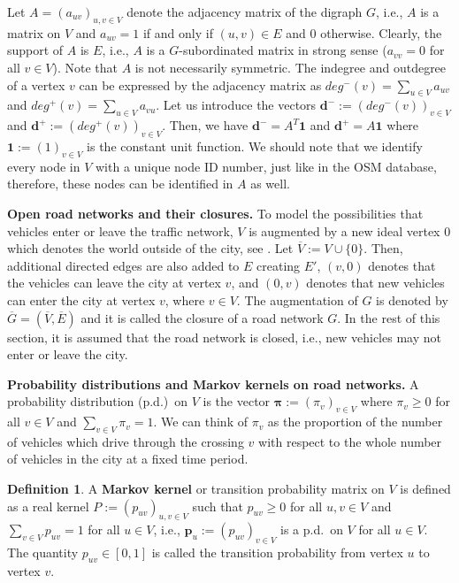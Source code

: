 \documentclass[b5paper,12pt]{report}
\theoremstyle{definition}
\newtheorem{definition}{Definition}
\newcommand{\bd}{\boldsymbol{d}}
\newcommand{\bp}{\boldsymbol{p}}
\newcommand{\bpi}{\boldsymbol{\pi}}
\begin{document}
Let $A = (a_{uv})_{u,v\in V} $ denote the adjacency matrix of the digraph $G$, i.e., $A$ is a matrix on $V$ and $a_{uv} = 1$ if and only if $(u,v) \in E$ and $0$ otherwise. Clearly, the support of $A$ is $E$, i.e., $A$ is a $G$-subordinated matrix in strong sense ($a_{vv} = 0$ for all $v \in V$). Note that $A$ is not necessarily symmetric. The indegree and outdegree of a vertex $v$ can be expressed by the adjacency matrix as $deg^{−}(v) = \sum_{u \in V} a_{uv}$ and $deg^{+}(v) = \sum_{u\in V} a_{vu}$. Let us introduce the vectors $\bd^{−} := (deg^{−}(v))_{v\in V}$ and $\bd^{+} := (deg^{+}(v))_{v \in V}$. Then, we have $\bd^{−} = A^T\textbf{1}$ and $\bd^{+} = A\textbf{1}$ where $\textbf{1} := (1)_{v \in V}$ is the constant unit function. We should note that we identify every node in $V$ with a unique node ID number, just like in the OSM database, therefore, these nodes can be identified in $A$ as well.

\smallskip

\textbf{Open road networks and their closures.} To model the possibilities that vehicles enter or leave the traffic network, $V$ is augmented by a new ideal vertex 0 which denotes the world outside of the city, see \cite{Faizrahetal2013}. Let $\overline{V} := V \cup \{0\}$. Then, additional directed edges are also added to $E$ creating $E'$, $(v, 0)$ denotes that the vehicles can leave the city at vertex $v$, and $(0, v)$ denotes that new vehicles can enter the city at vertex $v$, where $v \in V$. The augmentation of $G$ is denoted by $\overline{G} = (\overline{V}, \overline{E})$ and it is called the closure of a road network $G$. In the rest of this section, it is assumed that the road network is closed, i.e., new vehicles may not enter or leave the city. 

\textbf{Probability distributions and Markov kernels on road networks.} A probability distribution (p.d.)~on $V$ is the vector $\bpi := (\pi_v)_{v \in V}$ where $\pi_v \geq 0$ for all $v \in V$ and $\sum_{v \in V} \pi_v = 1$. We can think of $\pi_v$ as the proportion of the number of vehicles which drive through the crossing $v$ with respect to the whole number of vehicles in the city at a fixed time period. 

\begin{definition}
A {\bf{Markov kernel}} or transition probability matrix on $V$ is defined as a real kernel $P := (p_{uv})_{u,v \in V}$ such that $p_{uv} \geq 0$ for all $u, v \in V$ and $\sum_{v \in V} p_{uv} = 1$ for all $u \in V$, i.e., $\bp_u := (p_{uv})_{v \in V}$ is a p.d.~on $V$ for all $u \in V$. The quantity $p_{uv} \in [0, 1]$ is called the transition probability from vertex $u$ to vertex $v$. 
\end{definition}
\end{document}

